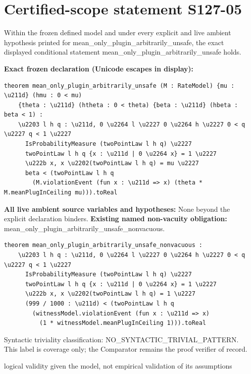 \documentclass[11pt]{article}
\begin{document}
\section*{Certified-scope statement S127-05}
Within the frozen defined model and under every explicit and live ambient hypothesis printed for mean\_\allowbreak{}only\_\allowbreak{}plugin\_\allowbreak{}arbitrarily\_\allowbreak{}unsafe, the exact displayed conditional statement mean\_\allowbreak{}only\_\allowbreak{}plugin\_\allowbreak{}arbitrarily\_\allowbreak{}unsafe holds.
\par\noindent\textbf{Exact frozen declaration (Unicode escapes in display):}
\begin{Verbatim}[breaklines=true,breakanywhere=true,fontsize=\scriptsize]
theorem mean_only_plugin_arbitrarily_unsafe (M : RateModel) {mu : \u211d} (hmu : 0 < mu)
    {theta : \u211d} (htheta : 0 < theta) {beta : \u211d} (hbeta : beta < 1) :
    \u2203 l h q : \u211d, 0 \u2264 l \u2227 0 \u2264 h \u2227 0 < q \u2227 q < 1 \u2227
      IsProbabilityMeasure (twoPointLaw l h q) \u2227
      twoPointLaw l h q {x : \u211d | 0 \u2264 x} = 1 \u2227
      \u222b x, x \u2202(twoPointLaw l h q) = mu \u2227
      beta < (twoPointLaw l h q
        (M.violationEvent (fun x : \u211d => x) (theta * M.meanPlugInCeiling mu))).toReal
\end{Verbatim}
\noindent\textbf{All live ambient source variables and hypotheses:}
None beyond the explicit declaration binders.
\noindent\textbf{Existing named non-vacuity obligation:} mean\_\allowbreak{}only\_\allowbreak{}plugin\_\allowbreak{}arbitrarily\_\allowbreak{}unsafe\_\allowbreak{}nonvacuous.
\begin{Verbatim}[breaklines=true,breakanywhere=true,fontsize=\scriptsize]
theorem mean_only_plugin_arbitrarily_unsafe_nonvacuous :
    \u2203 l h q : \u211d, 0 \u2264 l \u2227 0 \u2264 h \u2227 0 < q \u2227 q < 1 \u2227
      IsProbabilityMeasure (twoPointLaw l h q) \u2227
      twoPointLaw l h q {x : \u211d | 0 \u2264 x} = 1 \u2227
      \u222b x, x \u2202(twoPointLaw l h q) = 1 \u2227
      (999 / 1000 : \u211d) < (twoPointLaw l h q
        (witnessModel.violationEvent (fun x : \u211d => x)
          (1 * witnessModel.meanPlugInCeiling 1))).toReal
\end{Verbatim}
\noindent Syntactic triviality classification: NO\_\allowbreak{}SYNTACTIC\_\allowbreak{}TRIVIAL\_\allowbreak{}PATTERN. This label is coverage only; the Comparator remains the proof verifier of record.
\par\noindent logical validity given the model, not empirical validation of its assumptions
\end{document}
